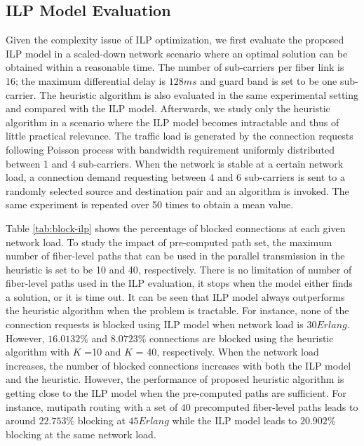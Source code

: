 \documentclass[conference]{IEEEtran}
\begin{document}
\subsection{ILP Model Evaluation} \label{small}
 \par Given the complexity issue of ILP optimization, we first evaluate the proposed ILP model in a scaled-down network scenario where an optimal solution can be obtained within a reasonable time. The number of sub-carriers per fiber link is 16; the maximum differential delay  is  $128ms$ and guard band is set to be one sub-carrier.
The heuristic algorithm is also evaluated in the  same experimental setting and compared with the ILP model.  
Afterwards,  we study only the heuristic algorithm in a scenario where the ILP model becomes intractable and thus of little practical relevance.     The traffic load is generated by the connection requests following Poisson process with bandwidth requirement uniformly distributed between 1   and 4 sub-carriers. When the  network is stable at a certain network load, a  connection demand requesting between 4 and 6  sub-carriers is sent to a randomly selected source and destination pair and an algorithm is invoked. The same experiment is repeated over 50 times to obtain a mean value.
  
\par    Table \ref{tab:block-ilp} shows the percentage of blocked connections  at each given network load. To study the impact of pre-computed path set,   the maximum number of fiber-level paths that can be used in the parallel transmission in the heuristic is set to be 10 and 40, respectively. There is no limitation of number of fiber-level paths used in the ILP evaluation, it stops when the model either finds a solution, or it is time out.   It can be seen that ILP model always outperforms the heuristic algorithm when the problem is tractable. For instance, none of  the connection requests is blocked using ILP model  when network load is $30 Erlang$. However,    $16.0132\%$ and $8.0723\%$  connections are blocked using the heuristic algorithm with $K$ =10 and  $K$ = 40, respectively. When the network load increases,  the number of blocked connections increases with both the ILP model and the  
    heuristic.  However,   the performance of proposed heuristic algorithm is getting close to the ILP model when the 
    pre-computed paths are sufficient. For instance, mutipath routing with a set of 40 precomputed fiber-level paths leads to      around $22.753 \%$ blocking at $45 Erlang$ while the ILP model leads to $20.902 \%$ blocking at the same     network load. 
    
\end{document}
